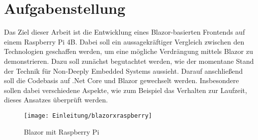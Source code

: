 \section{Aufgabenstellung}
\label{sec:aufgabenstellung}
Das Ziel dieser Arbeit ist die Entwicklung eines Blazor-basierten Frontends auf einem Raspberry Pi
4B. Dabei soll ein aussagekräftiger Vergleich zwischen den Technologien geschaffen werden, um
eine mögliche Verdrängung mittels Blazor zu demonstrieren.
Dazu soll zunächst begutachtet werden, wie der momentane Stand der Technik für Non-Deeply
Embedded Systems aussieht. Darauf anschließend soll die Codebasis auf .Net Core und Blazor
gewechselt werden.
Insbesondere sollen dabei verschiedene Aspekte, wie zum Beispiel das Verhalten zur Laufzeit,
dieses Ansatzes überprüft werden.
\begin{figure}[h]
    \centering
    \texttt{[image: Einleitung/blazorxraspberry]}
    \caption[Blazor mit Raspberry Pi]{Blazor mit Raspberry Pi}
    \label{img:blazorxraspberry}
\end{figure}